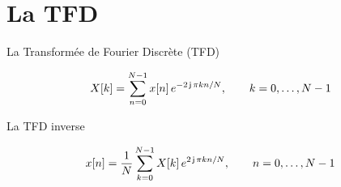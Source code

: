 \documentclass[aspectratio=43,10pt]{beamer}
\newcommand{\captureplaceholder}[1]{%
    \begin{center}
    \fbox{\parbox{0.75\linewidth}{\centering\vspace{1.5em}\textit{[CAPTURE À VENIR : #1]}\vspace{1.5em}}}
    \end{center}
}
\begin{document}
\section{La TFD}


\begin{frame}{La Transformée de Fourier Discrète (TFD)}
    \begin{center}
        \Large
        $$X[k] = \sum_{n=0}^{N-1} x[n]\,e^{-2\operatorname{\mathsf{j}}\pi kn/N}, \qquad k=0,\dots,N-1$$
    \end{center}
\end{frame}

\begin{frame}{La TFD inverse}
    \begin{center}
        \Large
        $$x[n] = \frac1N\sum_{k=0}^{N-1} X[k]\,e^{2\operatorname{\mathsf{j}}\pi kn/N}, \qquad n=0,\dots,N-1$$
    \end{center}
\end{frame}

\end{document}
